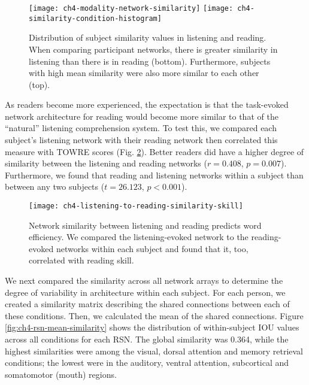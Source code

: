 \begin{figure}[t!]
	\centering
	\texttt{[image: ch4-modality-network-similarity]}
	\texttt{[image: ch4-similarity-condition-histogram]}
    \caption[Network similarity across subjects in listening and reading.] {Distribution of subject similarity values in listening and reading. When comparing participant networks, there is greater similarity in listening than there is in reading (bottom). Furthermore, subjects with high mean similarity were also more similar to each other (top).}
	\label{fig:ch4-modality-network-similarity}
\end{figure}

As readers become more experienced, the expectation is that the task-evoked network architecture for reading would become more similar to that of the ``natural'' listening comprehension system. To test this, we compared each subject's listening network with their reading network then correlated this measure with TOWRE scores (Fig. \ref{fig:ch4-modality-similarity-to-reading}). Better readers did have a higher degree of similarity between the listening and reading networks ($r = 0.408$, $p = 0.007$). Furthermore, we found that reading and listening networks within a subject than between any two subjects ($t = 26.123$, $p < 0.001$). 

\begin{figure}[t!]
	\centering
	\texttt{[image: ch4-listening-to-reading-similarity-skill]}
    \caption[Network similarity between listening and reading predicts word efficiency]{Network similarity between listening and reading predicts word efficiency. We compared the listening-evoked network to the reading-evoked networks within each subject and found that it, too, correlated with reading skill.}
	\label{fig:ch4-modality-similarity-to-reading}
\end{figure}

We next compared the similarity across all network arrays to determine the degree of variability in architecture within each subject. For each person, we created a similarity matrix describing the shared connections between each of these conditions. Then, we calculated the mean of the shared connections. Figure \ref{fig:ch4-rsn-mean-similarity} shows the distribution of within-subject IOU values across all conditions for each RSN. The global similarity was 0.364, while the highest similarities were among the visual, dorsal attention and memory retrieval conditions; the lowest were in the auditory, ventral attention, subcortical and somatomotor (mouth) regions.

